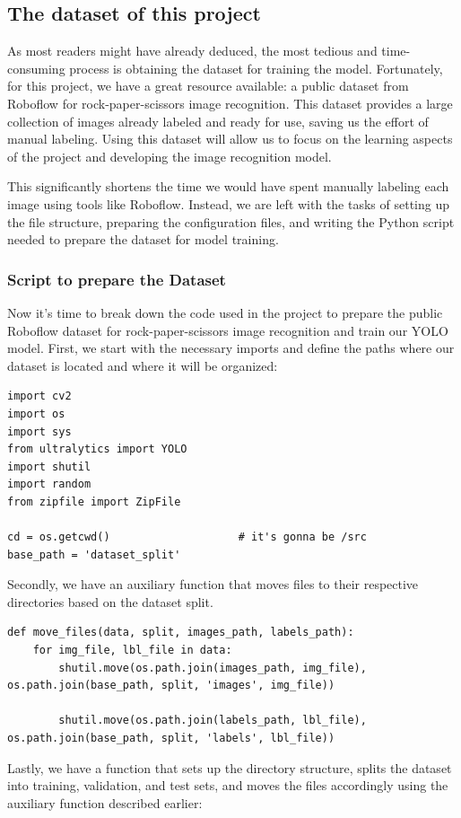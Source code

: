 \documentclass[../main]{subfiles}
\begin{document}
\newpage

\subsection{The dataset of this project}
As most readers might have already deduced, the most tedious and time-consuming process is obtaining the dataset for training the model. Fortunately, for this project, we have a great resource available: a public dataset from Roboflow for rock-paper-scissors image recognition. This dataset provides a large collection of images already labeled and ready for use, saving us the effort of manual labeling. Using this dataset will allow us to focus on the learning aspects of the project and developing the image recognition model.

This significantly shortens the time we would have spent manually labeling each image using tools like Roboflow. Instead, we are left with the tasks of setting up the file structure, preparing the configuration files, and writing the Python script needed to prepare the dataset for model training.

\subsubsection{Script to prepare the Dataset}
Now it’s time to break down the code used in the project to prepare the public Roboflow dataset for rock-paper-scissors image recognition and train our YOLO model. First, we start with the necessary imports and define the paths where our dataset is located and where it will be organized:

\begin{lstlisting}
import cv2
import os
import sys
from ultralytics import YOLO
import shutil
import random
from zipfile import ZipFile

cd = os.getcwd()                    # it's gonna be /src
base_path = 'dataset_split'
\end{lstlisting}
Secondly, we have an auxiliary function that moves files to their respective directories based on the dataset split.
\begin{lstlisting}
def move_files(data, split, images_path, labels_path):
    for img_file, lbl_file in data:
        shutil.move(os.path.join(images_path, img_file), os.path.join(base_path, split, 'images', img_file))
        
        shutil.move(os.path.join(labels_path, lbl_file), os.path.join(base_path, split, 'labels', lbl_file))
\end{lstlisting}
Lastly, we have a function that sets up the directory structure, splits the dataset into training, validation, and test sets, and moves the files accordingly using the auxiliary function described earlier:
\end{document}
